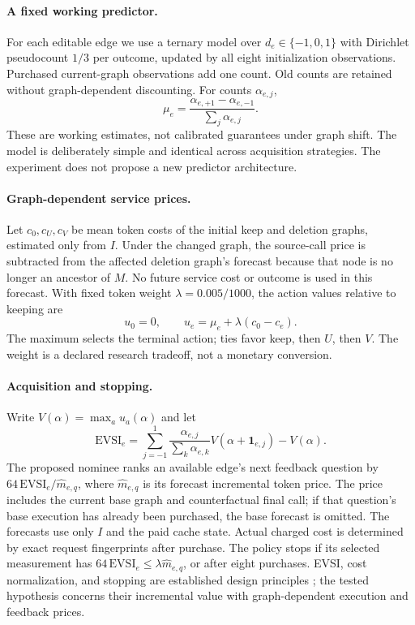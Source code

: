 \paragraph{A fixed working predictor.}
For each editable edge we use a ternary model over $d_e\in\{-1,0,1\}$ with
Dirichlet pseudocount $1/3$ per outcome, updated by all eight initialization
observations. Purchased current-graph observations add one count. Old counts
are retained without graph-dependent discounting. For counts $\alpha_{e,j}$,
\begin{equation}
 \mu_e=\frac{\alpha_{e,+1}-\alpha_{e,-1}}{\sum_j\alpha_{e,j}}.
\end{equation}
These are working estimates, not calibrated guarantees under graph shift.
The model is deliberately simple and identical across acquisition strategies.
The experiment does not propose a new predictor architecture.

\paragraph{Graph-dependent service prices.}
Let $c_0,c_U,c_V$ be mean token costs of the initial keep and deletion graphs,
estimated only from $I$. Under the changed graph, the source-call price is
subtracted from the affected deletion graph's forecast because that node is
no longer an ancestor of $M$. No future service cost or outcome is used in
this forecast. With fixed token weight $\lambda=0.005/1000$, the action values
relative to keeping are
\begin{equation}
 u_0=0,\qquad u_e=\mu_e+\lambda(c_0-c_e).
\end{equation}
The maximum selects the terminal action; ties favor keep, then $U$, then $V$.
The weight is a declared research tradeoff, not a monetary conversion.

\paragraph{Acquisition and stopping.}
Write $V(\alpha)=\max_a u_a(\alpha)$ and let
\begin{equation}
 \mathrm{EVSI}_e=\sum_{j=-1}^{1}
 \frac{\alpha_{e,j}}{\sum_k\alpha_{e,k}}
 V(\alpha+\mathbf{1}_{e,j})-V(\alpha).
\end{equation}
The proposed nominee ranks an available edge's next feedback question by
$64\,\mathrm{EVSI}_e/\widehat m_{e,q}$, where $\widehat m_{e,q}$ is its
forecast incremental token price. The price includes the current base graph
and counterfactual final call; if that question's base execution has already
been purchased, the base forecast is omitted. The forecasts use only $I$ and
the paid cache state. Actual charged cost is determined by exact request
fingerprints after purchase. The policy stops if its selected measurement has
$64\,\mathrm{EVSI}_e\leq\lambda\widehat m_{e,q}$, or after eight purchases.
EVSI, cost normalization, and stopping are established design principles
\citep{diva}; the tested hypothesis concerns their incremental value with
graph-dependent execution and feedback prices.

